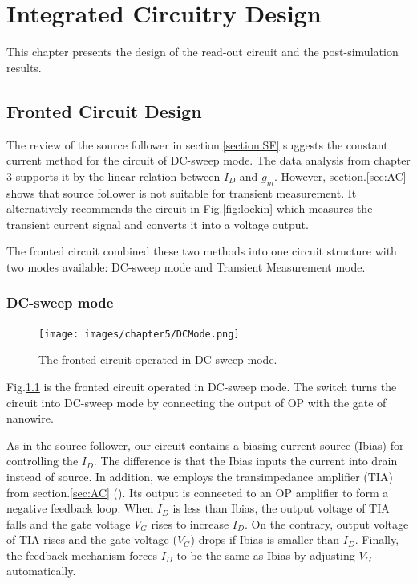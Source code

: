\chapter{Integrated Circuitry Design}
This chapter presents the design of the read-out circuit and the post-simulation results.


\section{Fronted Circuit Design}
The review of the source follower in section.\ref{section:SF} suggests the constant current method for the circuit of DC-sweep mode.
The data analysis from chapter 3 supports it by the linear relation between $I_D$ and $g_m$.
However, section.\ref{sec:AC} shows that source follower is not suitable for transient measurement.
It alternatively recommends the circuit in Fig.\ref{fig:lockin} which measures the transient current signal and converts it into a voltage output.

The fronted circuit combined these two methods into one circuit structure with two modes available: DC-sweep mode and Transient Measurement mode.

\subsection{DC-sweep mode}
\begin{figure}[!htbp]
    \centering
    \texttt{[image: images/chapter5/DCMode.png]}
    \caption{The fronted circuit operated in DC-sweep mode.}
    \label{fig:DCmode}
\end{figure}
Fig.\ref{fig:DCmode} is the fronted circuit operated in DC-sweep mode.
The switch turns the circuit into DC-sweep mode by connecting the output of OP with the gate of nanowire.

As in the source follower, our circuit contains a biasing current source (Ibias) for controlling the $I_D$.
The difference is that the Ibias inputs the current into drain instead of source.
In addition, we employs the transimpedance amplifier (TIA) from section.\ref{sec:AC} (\cite{Jlockin}).
Its output is connected to an OP amplifier to form a negative feedback loop.
When $I_D$ is less than Ibias, the output voltage of TIA falls and the gate voltage $V_G$ rises to increase $I_D$.
On the contrary, output voltage of TIA rises and the gate voltage ($V_G$) drops if Ibias is smaller than $I_D$.
Finally, the feedback mechanism forces $I_D$ to be the same as Ibias by adjusting $V_G$ automatically.


